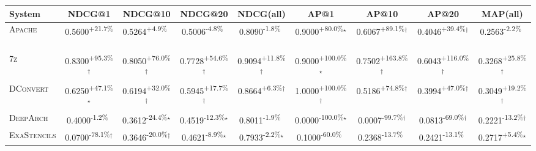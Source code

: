 \begin{table}[htbp]
\centering
\renewcommand{\arraystretch}{1.2}
\begin{tabular}{l|cccc|cccc}
\hline
System & NDCG@1 & NDCG@10 & NDCG@20 & NDCG(all) & AP@1 & AP@10 & AP@20 & MAP(all) \\ \hline
\textsc{Apache} & \cellcolor{green!30}0.5600\textsuperscript{+21.7\%}$^{\,\,\,}$ & \cellcolor{green!30}0.5264\textsuperscript{+4.9\%}$^{\,\,\,}$ & \cellcolor{red!30}0.5006\textsuperscript{-4.8\%}$^{\,\,\,}$ & \cellcolor{red!30}0.8090\textsuperscript{-1.8\%}$^{\,\,\,}$ & \cellcolor{green!30}0.9000\textsuperscript{+80.0\%}$^\star$ & \cellcolor{green!30}0.6067\textsuperscript{+89.1\%}$^\dagger$ & \cellcolor{green!30}0.4046\textsuperscript{+39.4\%}$^\dagger$ & \cellcolor{red!30}0.2563\textsuperscript{-2.2\%}$^{\,\,\,}$ \\
\textsc{7z} & \cellcolor{green!30}0.8300\textsuperscript{+95.3\%}$^\dagger$ & \cellcolor{green!30}0.8050\textsuperscript{+76.0\%}$^\dagger$ & \cellcolor{green!30}0.7728\textsuperscript{+54.6\%}$^\dagger$ & \cellcolor{green!30}0.9094\textsuperscript{+11.8\%}$^\dagger$ & \cellcolor{green!30}0.9000\textsuperscript{+100.0\%}$^\star$ & \cellcolor{green!30}0.7502\textsuperscript{+163.8\%}$^\dagger$ & \cellcolor{green!30}0.6043\textsuperscript{+116.0\%}$^\dagger$ & \cellcolor{green!30}0.3268\textsuperscript{+25.8\%}$^\dagger$ \\
\textsc{DConvert} & \cellcolor{green!30}0.6250\textsuperscript{+47.1\%}$^\star$ & \cellcolor{green!30}0.6194\textsuperscript{+32.0\%}$^\dagger$ & \cellcolor{green!30}0.5945\textsuperscript{+17.7\%}$^\dagger$ & \cellcolor{green!30}0.8664\textsuperscript{+6.3\%}$^\dagger$ & \cellcolor{green!30}1.0000\textsuperscript{+100.0\%}$^\dagger$ & \cellcolor{green!30}0.5186\textsuperscript{+74.8\%}$^\dagger$ & \cellcolor{green!30}0.3994\textsuperscript{+47.0\%}$^\dagger$ & \cellcolor{green!30}0.3049\textsuperscript{+19.2\%}$^\dagger$ \\
\textsc{DeepArch} & \cellcolor{red!30}0.4000\textsuperscript{-1.2\%}$^{\,\,\,}$ & \cellcolor{red!30}0.3612\textsuperscript{-24.4\%}$^\star$ & \cellcolor{red!30}0.4519\textsuperscript{-12.3\%}$^\star$ & \cellcolor{red!30}0.8011\textsuperscript{-1.9\%}$^{\,\,\,}$ & \cellcolor{red!30}0.0000\textsuperscript{-100.0\%}$^\star$ & \cellcolor{red!30}0.0007\textsuperscript{-99.7\%}$^\dagger$ & \cellcolor{red!30}0.0813\textsuperscript{-69.0\%}$^\dagger$ & \cellcolor{red!30}0.2221\textsuperscript{-13.2\%}$^\dagger$ \\
\textsc{ExaStencils} & \cellcolor{red!30}0.0700\textsuperscript{-78.1\%}$^\dagger$ & \cellcolor{red!30}0.3646\textsuperscript{-20.0\%}$^\dagger$ & \cellcolor{red!30}0.4621\textsuperscript{-8.9\%}$^\star$ & \cellcolor{red!30}0.7933\textsuperscript{-2.2\%}$^\star$ & \cellcolor{red!30}0.1000\textsuperscript{-60.0\%}$^{\,\,\,}$ & \cellcolor{red!30}0.2368\textsuperscript{-13.7\%}$^{\,\,\,}$ & \cellcolor{red!30}0.2421\textsuperscript{-13.1\%}$^{\,\,\,}$ & \cellcolor{green!30}0.2717\textsuperscript{+5.4\%}$^\star$ \\

\end{tabular}
\end{table}
